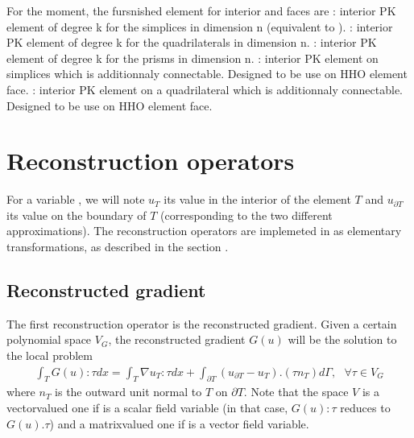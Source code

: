 \documentclass[a4paper,11pt,english]{sphinxmanual}
\begin{document}
For the moment, the fursnished element for interior and faces are
\sphinxhyphen{}  : interior PK element of degree k for the simplices in dimension n (equivalent to ).
\sphinxhyphen{}  : interior PK element of degree k for the quadrilaterals in dimension n.
\sphinxhyphen{}  : interior PK element of degree k for the prisms in dimension n.
\sphinxhyphen{}  : interior PK element on simplices which is additionnaly connectable. Designed to be use on HHO element face.
\sphinxhyphen{}  : interior PK element on a quadrilateral which is additionnaly connectable. Designed to be use on HHO element face.


\section{Reconstruction operators}
\label{\detokenize{userdoc/hho:reconstruction-operators}}
For a variable , we will note \(u_{T}\) its value in the interior of the element \(T\) and \(u_{\partial T}\) its value on the boundary of \(T\) (corresponding to the two different approximations). The reconstruction operators are implemeted in  as elementary transformations, as described in the section {\hyperref[\detokenize{userdoc/gasm_high:ud-gasm-high-elem-trans}]{}}.


\subsection{Reconstructed gradient}
\label{\detokenize{userdoc/hho:reconstructed-gradient}}
The first reconstruction operator is the reconstructed gradient. Given a certain polynomial space \(V_G\), the reconstructed gradient \(G(u)\) will be the solution to the local problem
\begin{equation*}
\begin{split}\int_T G(u):\tau dx = \int_T \nabla u_T : \tau dx + \int_{\partial T} (u_{\partial T} - u_{T}).(\tau n_T) d\Gamma, ~~~ \forall \tau \in V_G\end{split}
\end{equation*}
where \(n_T\) is the outward unit normal to  \(T\) on  \(\partial T\). Note that the space \(V\) is a vector\sphinxhyphen{}valued one if  is a scalar field variable (in that case, \(G(u):\tau\) reduces to \(G(u).\tau\)) and a matrix\sphinxhyphen{}valued one if  is a vector field variable.
\end{document}
